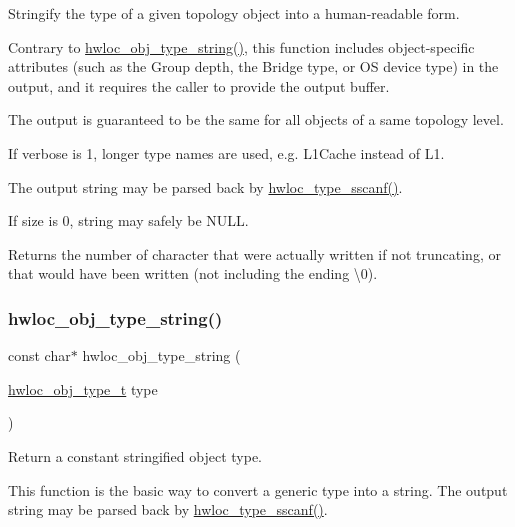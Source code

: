 Stringify the type of a given topology object into a human-\/readable form. 

Contrary to \hyperlink{a00188_ga5ca0bf94bbbb080d0eff17a57bd90422}{hwloc\+\_\+obj\+\_\+type\+\_\+string()}, this function includes object-\/specific attributes (such as the Group depth, the Bridge type, or OS device type) in the output, and it requires the caller to provide the output buffer.

The output is guaranteed to be the same for all objects of a same topology level.

If {\ttfamily verbose} is 1, longer type names are used, e.\+g. L1\+Cache instead of L1.

The output string may be parsed back by \hyperlink{a00188_ga510f21b066fba2dab12b8c9b173b1dfd}{hwloc\+\_\+type\+\_\+sscanf()}.

If {\ttfamily size} is 0, {\ttfamily string} may safely be {\ttfamily N\+U\+LL}.

\begin{DoxyReturn}{Returns}
the number of character that were actually written if not truncating, or that would have been written (not including the ending \textbackslash{}0). 
\end{DoxyReturn}
\mbox{\label{a00188_ga5ca0bf94bbbb080d0eff17a57bd90422}} 
\subsubsection{\texorpdfstring{hwloc\+\_\+obj\+\_\+type\+\_\+string()}{hwloc\_obj\_type\_string()}}
{\footnotesize\ttfamily const char$\ast$ hwloc\+\_\+obj\+\_\+type\+\_\+string (\begin{DoxyParamCaption}\item[{\hyperlink{a00184_gacd37bb612667dc437d66bfb175a8dc55}{hwloc\+\_\+obj\+\_\+type\+\_\+t}}]{type }\end{DoxyParamCaption})}



Return a constant stringified object type. 

This function is the basic way to convert a generic type into a string. The output string may be parsed back by \hyperlink{a00188_ga510f21b066fba2dab12b8c9b173b1dfd}{hwloc\+\_\+type\+\_\+sscanf()}.


